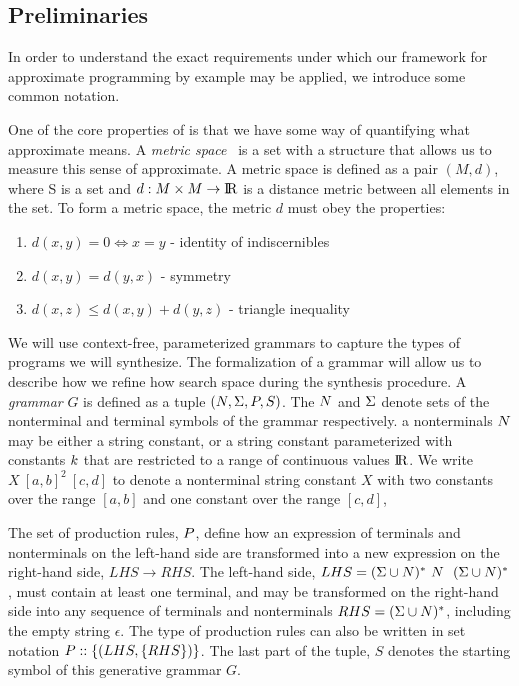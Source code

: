 \subsection{Preliminaries}

In order to understand the exact requirements under which our framework for approximate programming by example may be applied, we introduce some common notation.

One of the core properties of \approximatePBE is that we have some way of quantifying what approximate means.
A \textit{metric space}~\cite{textbook} is a set with a structure that allows us to measure this sense of approximate.
A metric space is defined as a pair $(M,d)$, where S is a set and $d:M \times M \to {\rm I\!R}$ is a distance metric between all elements in the set. 
To form a metric space, the metric $d$ must obey the properties:

\begin{enumerate}
  \item $d(x,y) = 0 \Leftrightarrow x = y$ - identity of indiscernibles
  \item $d(x,y)  = d(y,x)$ - symmetry
  \item $d(x,z) \le d(x,y) + d(y, z)$ - triangle inequality
\end{enumerate}

We will use context-free, parameterized grammars to capture the types of programs we will synthesize.
The formalization of a grammar will allow us to describe how we refine how search space during the synthesis procedure.
A \textit{grammar} $G$ is defined as a tuple $(N,\Sigma,P,S)$.
The $N$ and $\Sigma$ denote sets of the nonterminal and terminal symbols of the grammar respectively.
a nonterminals $N$ may be either a string constant, or a string constant parameterized with constants ${k}$ that are restricted to a range of continuous values ${\rm I\!R}$.
We write $X\ [a,b]^2 \ [c,d]$ to denote a nonterminal string constant $X$ with two constants over the range $[a,b]$ and one constant over the range $[c,d]$,

The set of production rules, $P$, define how an expression of terminals and nonterminals on the left-hand side are transformed into a new expression on the right-hand side, $LHS \to RHS$.
The left-hand side, $LHS = (\Sigma \cup N)^{*} \ N \ \ (\Sigma \cup N)^{*}$, must contain at least one terminal, 
  and may be transformed on the right-hand side into any sequence of terminals and nonterminals $RHS = (\Sigma \cup N)^{*}$, including the empty string $\epsilon$.
The type of production rules can also be written in set notation $P :: \{(LHS,\{RHS\})\}$.
The last part of the tuple, $S$ denotes the starting symbol of this generative grammar $G$.

